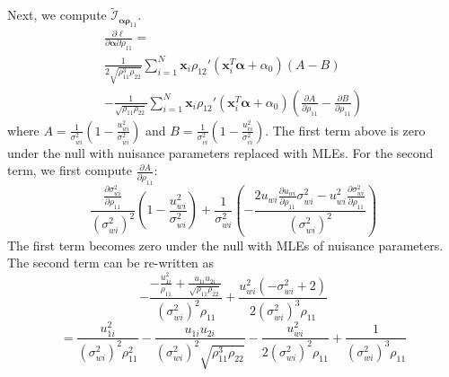 \documentclass[aap,authoryear, preprint]{imsart}
\numberwithin{equation}{section}
\theoremstyle{plain}
\begin{document}

\noindent Next, we compute $\tilde{\mathcal{I}}_{\bm{\alpha}\bm{\rho}_{11}}$.
\begin{equation}
    \begin{multlined}
    \frac{\partial \ell}{\partial \bm{\alpha}\partial\rho_{11}} = \\
    \frac{1}{2\sqrt{\rho_{11}^3\rho_{22}}} \sum_{i=1}^{N} \bm{x}_i \rho_{12}'(\bm{x}_i^T\bm{\alpha}+\alpha_0) (A-B)\\
    - \frac{1}{\sqrt{\rho_{11}\rho_{22}}} \sum_{i=1}^{N} \bm{x}_i \rho_{12}'(\bm{x}_i^T\bm{\alpha} + \alpha_0) \left( \frac{\partial A}{\partial \rho_{11}} - \frac{\partial B}{\partial \rho_{11}}\right)
    \end{multlined}
    \end{equation}
where $A = \frac{1}{\sigma_{wi}^2} \left( 1 - \frac{u_{wi}^2}{\sigma_{wi}^2}\right)$ and $B = \frac{1}{\sigma_{vi}^2} \left( 1-\frac{u_{vi}^2}{\sigma_{vi}^2}\right)$. The first term above is zero under the null with nuisance parameters replaced with MLEs. For the second term, we first compute $\frac{\partial A}{\partial \rho_{11}}:$
$$\frac{\frac{\partial \sigma_{wi}^2}{\partial \rho_{11}}}{(\sigma_{wi}^2)^2} \left( 1 - \frac{u_{wi}^2}{\sigma_{wi}^2} \right) + \frac{1}{\sigma_{wi}^2} \left(
-\frac{2u_{wi} \frac{\partial u_{wi}}{\partial \rho_{11}} \sigma_{wi}^2 - u_{wi}^2 \frac{\partial \sigma_{wi}^2}{\partial \rho_{11}}}{(\sigma_{wi}^2)^2}
\right)$$
The first term becomes zero under the null with MLEs of nuisance parameters. The second term can be re-written as
$$
-\frac{-\frac{u_{1i}^2}{\rho_{11}} + \frac{u_{1i}u_{2i}}{\sqrt{\rho_{11}\rho_{22}}}}{(\sigma_{wi}^2)^2\rho_{11}}
+ \frac{u_{wi}^2(-\sigma_{wi}^2 + 2)}{2(\sigma_{wi}^2)^3\rho_{11}}
$$
$$=\frac{u_{1i}^2}{(\sigma_{wi}^2)^2 \rho_{11}^2} - \frac{u_{1i}u_{2i}}{(\sigma_{wi}^2)^2 \sqrt{\rho_{11}^3 \rho_{22}}} - \frac{u_{wi}^2}{2(\sigma_{wi}^2)^2 \rho_{11}} + \frac{1}{(\sigma_{wi}^2)^3\rho_{11}}$$
\end{document}
